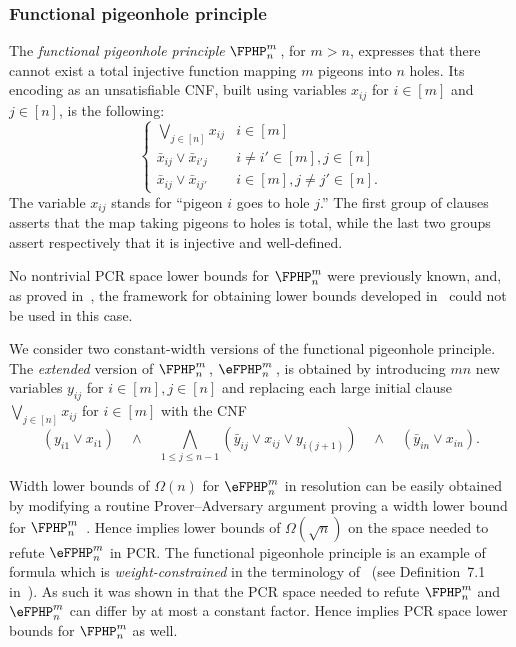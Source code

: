 \subsubsection{Functional pigeonhole principle}
The \emph{functional pigeonhole principle} $\FPHP^m_n$\,, for $m > n$, 
expresses that there cannot exist a total injective function mapping $m$ pigeons into $n$ holes. 
Its encoding as an unsatisfiable CNF, built using variables $x_{ij}$ for $i\in[m]$ and $j\in [n]$, is the following:
$$
\left \{
\begin{array}{ll}
\bigvee_{j\in[n]}x_{ij}  & i \in [m]   \\
\bar x_{ij} \vee \bar x_{i'j}  & i \not = i' \in [m],  j\in[n] \\
\bar x_{ij} \vee \bar x_{ij'}& i \in [m],  j \not = j'\in[n].
\end{array}
\right.
$$
The variable $x_{ij}$ stands for ``pigeon $i$ goes to hole $j$.''
The first group of clauses
asserts that the map taking pigeons to holes is total, 
while the last two groups assert
respectively that it is injective and well-defined.%

No nontrivial PCR 
space lower bounds for $\FPHP^m_n$ were previously known,  
and, as proved in~\cite{DBLP:conf/icalp/FilmusLMNV13},
the framework for obtaining lower bounds developed in~\cite{DBLP:journals/jacm/BonacinaG15} could not be used in this case.

We consider two constant-width versions of the functional pigeonhole principle. 
The \emph{extended} version of $\FPHP^m_n$\,, 
$\eFPHP^m_n$\,, is obtained by 
introducing $mn$ new variables  $y_{ij}$ for $i\in[m], j\in[n]$
and
replacing each large initial clause $\bigvee_{j\in[n]}x_{ij}$  for \mbox{$i \in [m]$}
with the CNF
\[
(y_{i1} \vee x_{i1})
\quad \wedge \quad
\bigwedge_{1 \leq  j \leq n-1} (\bar y_{ij} \vee x_{ij} \vee y_{i(j+1)})  
\quad \wedge \quad
 (\bar y_{in} \vee x_{in}).
\]

Width lower bounds of $\Omega(n)$ for  $\eFPHP^m_n$ in resolution can be easily obtained by modifying a routine Prover--Adversary argument
proving a width lower bound for $\FPHP^m_n$~\cite{DBLP:journals/jcss/AtseriasD08}.
Hence  implies lower bounds of $\Omega(\sqrt{n})$ 
on the space needed to refute $\eFPHP^m_n$ in PCR.  
The functional pigeonhole principle is an example of formula which is 
 \emph{weight-constrained} in the terminology of~\cite{DBLP:journals/siamcomp/FilmusLNRT15} 
 (see Definition~7.1 in~\cite{DBLP:journals/siamcomp/FilmusLNRT15}).
As such it was shown in \cite[Theorem 1.5]{DBLP:journals/siamcomp/FilmusLNRT15}
that the PCR space needed to refute $\FPHP^m_n$ and $\eFPHP^m_n$ can differ by at most a constant factor. 
Hence  implies PCR space lower bounds for $\FPHP^m_n$ as well.

